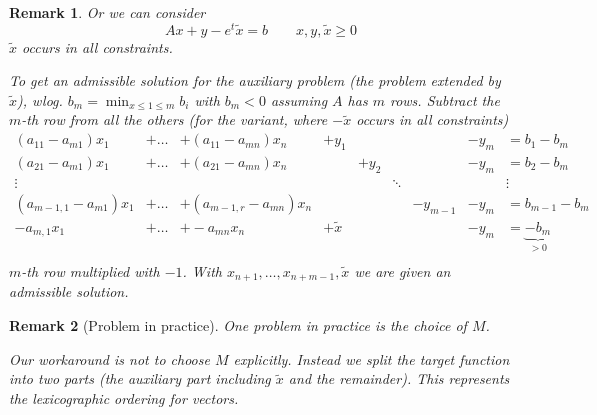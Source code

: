 \documentclass[a4paper]{article}
\numberwithin{lecref}{subsection}
\newtheorem*{Remark}{Remark}
\begin{document}
\begin{Remark}
	Or we can consider 
	\[ Ax + y - e^t \tilde x = b \qquad x, y, \tilde x \geq 0 \]
	$\tilde x$ occurs in all constraints.

	To get an admissible solution for the auxiliary problem (the problem extended by $\tilde x$), wlog. $b_m = \min_{x \leq 1 \leq m} b_i$ with $b_m < 0$ assuming $A$ has $m$ rows.
	Subtract the $m$-th row from all the others (for the variant, where $-\tilde x$ occurs in all constraints)
	\begin{align}
		\label{mat}
		(a_{11} - a_{m1}) x_1 &+ \dots &+ (a_{11} - a_{mn}) x_n &+ y_1  &       &        &          & -y_m &= b_1 - b_m \\
		(a_{21} - a_{m1}) x_1 &+ \dots &+ (a_{21} - a_{mn}) x_n &       &+ y_2  &        &          & -y_m &= b_2 - b_m \nonumber\\
		\vdots                &        &                        &       &       & \ddots &          &      &\vdots \nonumber\\
		(a_{m-1,1} - a_{m1}) x_1 &+ \dots &+ (a_{m-1,r} - a_{mn}) x_n & &       &        & -y_{m-1} & -y_m &= b_{m-1} - b_m \nonumber\\
		-a_{m,1} x_1 &+ \dots &+ -a_{mn} x_n & + \tilde x &       &        &  & -y_m &= \underbrace{-b_{m}}_{>0} \nonumber\\
	\end{align}
	$m$-th row multiplied with $-1$.
	With $x_{n+1}, \dots, x_{n+m-1}, \tilde x$ we are given an admissible solution.
\end{Remark}

\begin{Remark}[Problem in practice]
	One problem in practice is the choice of $M$.

	Our workaround is not to choose $M$ explicitly. Instead we split the target function into two parts (the auxiliary part including $\tilde x$ and the remainder).
	This represents the lexicographic ordering for vectors.
\end{Remark}
\end{document}
